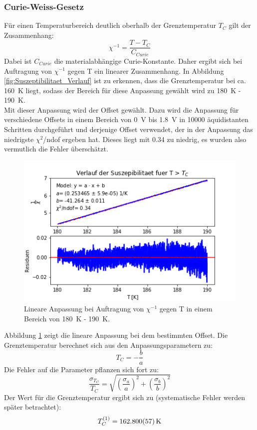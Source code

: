 \documentclass[12pt,a4paper]{article}
\begin{document}
\subsubsection{Curie-Weiss-Gesetz}
Für einen Temperaturbereich deutlich oberhalb der Grenztemperatur $T_C$ gilt der Zusammenhang:
\begin{equation*}
\chi ^{-1} = \dfrac{T - T_C}{C_{Curie}}
\end{equation*}
Dabei ist $C_{Curie}$ die materialabhängige Curie-Konstante. Daher ergibt sich bei Auftragung von $\chi ^{-1}$ gegen T ein linearer Zusammenhang. In Abbildung \ref{fig:Suszeptibilitaet_Verlauf} ist zu erkennen, dass die Grenztemperatur bei ca. \SI{160}{K} liegt, sodass der Bereich für diese Anpassung gewählt wird zu \SI{180}{K} - \SI{190}{K}. \\
Mit dieser Anpassung wird der Offset gewählt. Dazu wird die Anpassung für verschiedene Offsets in einem Bereich von \SI{0}{V} bis \SI{1,8}{V} in 10000 äquidistanten Schritten durchgeführt und derjenige Offset verwendet, der in der Anpassung das niedrigste $\chi ^2$/ndof ergeben hat. Dieses liegt mit 0.34 zu niedrig, es wurden also vermutlich die Fehler überschätzt.

\begin{figure}
\centering
\includegraphics[scale=1]{Bilder/Haupt_Probe/CurieWeiss.png}
\caption[test]{Lineare Anpassung bei Auftragung von $\chi ^{-1}$ gegen T in einem Bereich von \SI{180}{K} - \SI{190}{K}.}
\label{fig:CurieWeiss}
\end{figure}

Abbildung \ref{fig:CurieWeiss} zeigt die lineare Anpassung bei dem bestimmten Offset. Die Grenztemperatur berechnet sich aus den Anpassungsparametern zu:
\begin{equation}
T_C = -\dfrac{b}{a}
\label{eq:ProbeGrenztemperatur}
\end{equation}
Die Fehler auf die Parameter pflanzen sich fort zu:
\begin{equation}
\dfrac{\sigma _{T_C}}{T_C} = \sqrt{\left( \dfrac{\sigma _a}{a} \right)^2 + \left( \dfrac{\sigma _b}{b} \right)^2}
\label{eq:ProbeGrenztemperaturFehler}
\end{equation}
Der Wert für die Grenztemperatur ergibt sich zu (systematische Fehler werden später betrachtet):
\begin{equation*}
T_C^{(1)} = \SI{162,800 \pm 0,057}{K}
\end{equation*}
\end{document}
